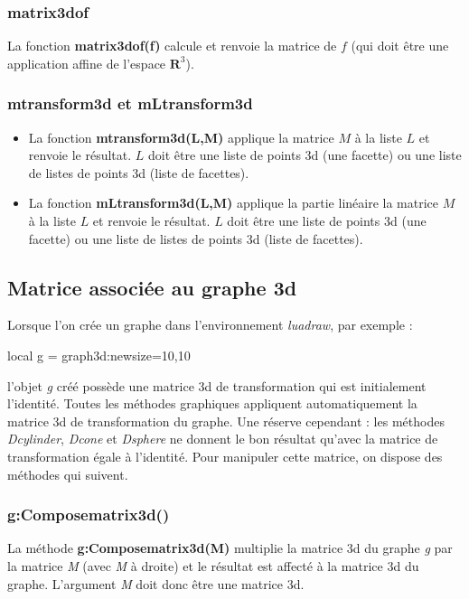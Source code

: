 \subsubsection{matrix3dof}

La fonction \textbf{matrix3dof(f)} calcule et renvoie la matrice de $f$ (qui doit être une application affine de l'espace $\mathbf R^3$).


\subsubsection{mtransform3d et mLtransform3d}
\begin{itemize}
    \item La fonction \textbf{mtransform3d(L,M)} applique la matrice $M$ à la liste $L$ et renvoie le résultat. $L$ doit être une liste de points 3d (une facette) ou une liste de listes de points 3d (liste de facettes).
    \item La fonction \textbf{mLtransform3d(L,M)} applique la partie linéaire la matrice $M$ à la liste $L$ et renvoie le résultat. $L$ doit être une liste de points 3d (une facette) ou une liste de listes de points 3d (liste de facettes).
\end{itemize}

\subsection{Matrice associée au graphe 3d}

Lorsque l'on crée un graphe dans l'environnement \emph{luadraw}, par exemple :
\begin{Luacode}
local g = graph3d:new{size={10,10}}
\end{Luacode}
l'objet \emph{g} créé possède une matrice 3d de transformation qui est initialement l'identité. Toutes les méthodes graphiques appliquent automatiquement la matrice 3d de transformation du graphe. Une réserve cependant : les méthodes \emph{Dcylinder}, \emph{Dcone} et \emph{Dsphere} ne donnent le bon résultat qu'avec la matrice de transformation égale à l'identité. Pour manipuler cette matrice, on dispose des méthodes qui suivent.

\subsubsection{g:Composematrix3d()}
La méthode \textbf{g:Composematrix3d(M)} multiplie la matrice 3d du graphe \emph g par la matrice \emph{M} (avec \emph{M} à droite) et le résultat est affecté à la matrice 3d du graphe. L'argument \emph{M} doit donc être une matrice 3d.

